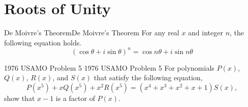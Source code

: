 \documentclass[../../main.tex]{subfiles}
\begin{document}
\section{Roots of Unity}


\begin{theorem}{De Moivre's Theorem}{De Moivre's Theorem}
For any real $x$ and integer $n$, the following equation holds.
\vspace{-0.8\baselineskip}
\[
(\cos\theta + i\sin\theta)^n = \cos n\theta + i\sin n\theta
\]
\end{theorem}



\begin{problem}{1976 USAMO Problem 5 \medium}{1976 USAMO Problem 5}
For polynomials $P(x)$, $Q(x)$, $R(x)$, and $S(x)$ that satisfy
the following equation,
\[
P(x^5) + xQ(x^5) + x^2 R(x^5)
= (x^4 + x^3 + x^2 + x + 1) S(x),
\]
show that $x - 1$ is a factor of $P(x)$.
\end{problem}
\end{document}
